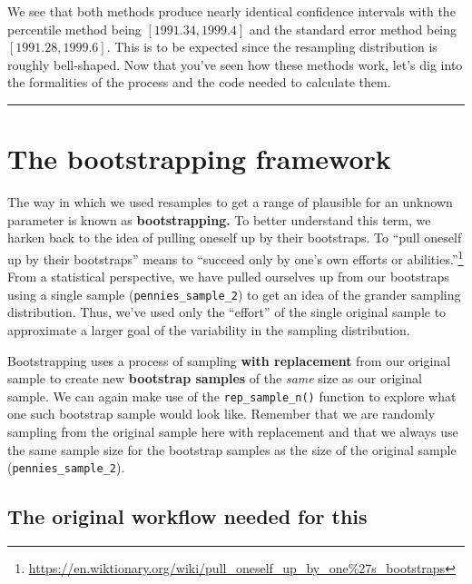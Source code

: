 \documentclass[12pt, krantz2,]{krantz}
\renewcommand{\href}[2]{#2\footnote{\url{#1}}}
\begin{document}
We see that both methods produce nearly identical confidence intervals with the percentile method being \([1991.34, 1999.4]\) and the standard error method being \([1991.28, 1999.6]\). This is to be expected since the resampling distribution is roughly bell-shaped. Now that you've seen how these methods work, let's dig into the formalities of the process and the code needed to calculate them.

\begin{center}\rule{0.5\linewidth}{\linethickness}\end{center}

\hypertarget{bootstrap-process}{%
\section{The bootstrapping framework}\label{bootstrap-process}}

The way in which we used resamples to get a range of plausible for an unknown parameter is known as \textbf{bootstrapping.} To better understand this term, we harken back to the idea of pulling oneself up by their bootstraps. To ``pull oneself up by their bootstraps'' means to \href{https://en.wiktionary.org/wiki/pull_oneself_up_by_one\%27s_bootstraps}{``succeed only by one's own efforts or abilities.''} From a statistical perspective, we have pulled ourselves up from our bootstraps using a single sample (\texttt{pennies\_sample\_2}) to get an idea of the grander sampling distribution. Thus, we've used only the ``effort'' of the single original sample to approximate a larger goal of the variability in the sampling distribution.

Bootstrapping uses a process of sampling \textbf{with replacement} from our original sample to create new \textbf{bootstrap samples} of the \emph{same} size as our original sample. We can again make use of the \texttt{rep\_sample\_n()} function to explore what one such bootstrap sample would look like. Remember that we are randomly sampling from the original sample here with replacement and that we always use the same sample size for the bootstrap samples as the size of the original sample (\texttt{pennies\_sample\_2}).

\hypertarget{the-original-workflow-needed-for-this}{%
\subsection{The original workflow needed for this}\label{the-original-workflow-needed-for-this}}
\end{document}
